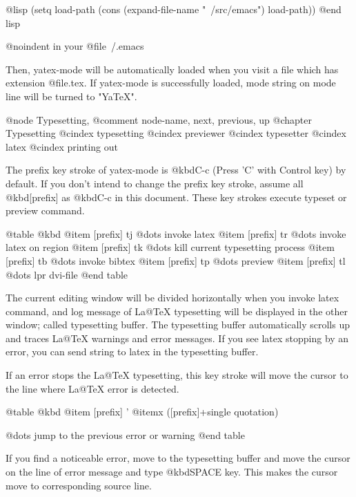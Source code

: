 @lisp
       (setq load-path
             (cons (expand-file-name "~/src/emacs") load-path))
@end lisp

@noindent
in your @file{~/.emacs}

  Then, yatex-mode will be automatically loaded when you visit a
file which has extension @file{.tex}.  If yatex-mode is successfully
loaded, mode string on mode line will be turned to "YaTeX".


@node Typesetting, %
@comment  node-name,  next,  previous,  up
@chapter Typesetting
@cindex typesetting
@cindex previewer
@cindex typesetter
@cindex latex
@cindex printing out

  The prefix key stroke of yatex-mode is @kbd{C-c} (Press 'C' with Control
key) by default.  If you don't intend to change the prefix key stroke,
assume all @kbd{[prefix]} as @kbd{C-c} in this document.  These key
strokes execute typeset or preview command.

@table @kbd
@item [prefix] tj
	@dots{}	invoke latex
@item [prefix] tr
	@dots{}	invoke latex on region
@item [prefix] tk
	@dots{}	kill current typesetting process
@item [prefix] tb
	@dots{}	invoke bibtex
@item [prefix] tp
	@dots{}	preview
@item [prefix] tl
	@dots{}	lpr dvi-file
@end table

  The current editing window will be divided horizontally when you
invoke latex command, and log message of La@TeX{} typesetting will be
displayed   in the other window;   called typesetting buffer.  The
typesetting  buffer automatically  scrolls  up  and  traces  La@TeX{}
warnings and  error  messages.  If  you  see latex stopping  by an
error, you can send string to latex in the typesetting buffer.

  If an error  stops the La@TeX{}  typesetting, this  key stroke will
move the cursor to the line where La@TeX{} error is detected.

@table @kbd
@item [prefix] '
@itemx ([prefix]+single quotation)

	@dots{}	jump to the previous error or warning
@end table

  If you find a noticeable error, move to the typesetting buffer and move
the cursor on the line of error message and type @kbd{SPACE} key.  This
makes the cursor move to corresponding source line.

